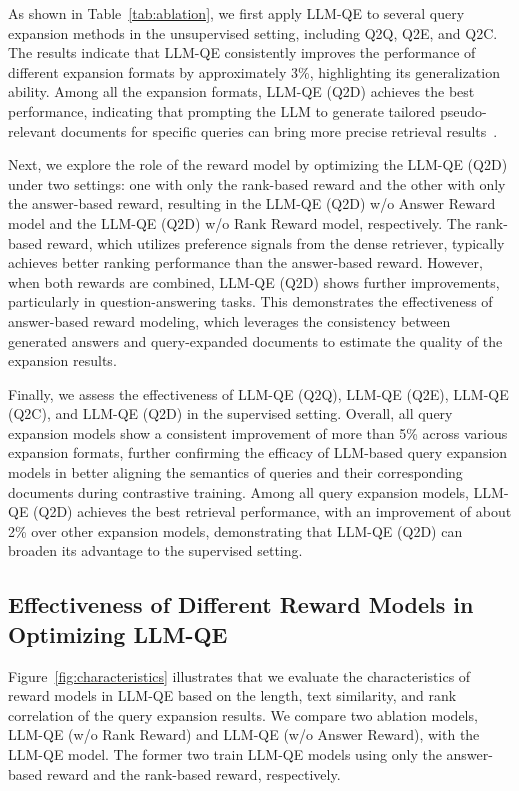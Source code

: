 As shown in Table~\ref{tab:ablation}, we first apply LLM-QE to several query expansion methods in the unsupervised setting, including Q2Q, Q2E, and Q2C. The results indicate that LLM-QE consistently improves the performance of different expansion formats by approximately 3\%, highlighting its generalization ability. Among all the expansion formats, LLM-QE (Q2D) achieves the best performance, indicating that prompting the LLM to generate tailored pseudo-relevant documents for specific queries can bring more precise retrieval results~\cite{gao2023precise}.

Next, we explore the role of the reward model by optimizing the LLM-QE (Q2D) under two settings: one with only the rank-based reward and the other with only the answer-based reward, resulting in the LLM-QE (Q2D) w/o Answer Reward model and the LLM-QE (Q2D) w/o Rank Reward model, respectively. The rank-based reward, which utilizes preference signals from the dense retriever, typically achieves better ranking performance than the answer-based reward. However, when both rewards are combined, LLM-QE (Q2D) shows further improvements, particularly in question-answering tasks. This demonstrates the effectiveness of answer-based reward modeling, which leverages the consistency between generated answers and query-expanded documents to estimate the quality of the expansion results.

Finally, we assess the effectiveness of LLM-QE (Q2Q), LLM-QE (Q2E), LLM-QE (Q2C), and LLM-QE (Q2D) in the supervised setting. Overall, all query expansion models show a consistent improvement of more than 5\% across various expansion formats, further confirming the efficacy of LLM-based query expansion models in better aligning the semantics of queries and their corresponding documents during contrastive training. Among all query expansion models, LLM-QE (Q2D) achieves the best retrieval performance, with an improvement of about 2\% over other expansion models, demonstrating that LLM-QE (Q2D) can broaden its advantage to the supervised setting.



\subsection{Effectiveness of Different Reward Models in Optimizing LLM-QE}
Figure~\ref{fig:characteristics} illustrates that we evaluate the characteristics of reward models in LLM-QE based on the length, text similarity, and rank correlation of the query expansion results. We compare two ablation models, LLM-QE (w/o Rank Reward) and LLM-QE (w/o Answer Reward), with the LLM-QE model. The former two train LLM-QE models using only the answer-based reward and the rank-based reward, respectively.


